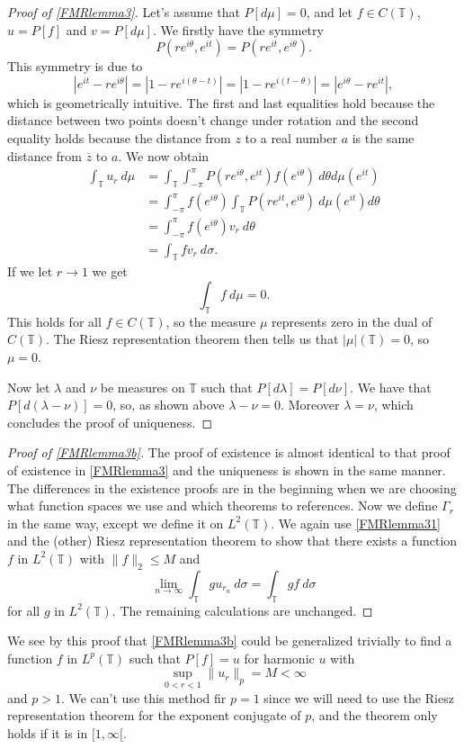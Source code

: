 \documentclass[a4paper,12pt,twoside,BCOR=10mm]{scrbook}
\theoremstyle{definition}
\theoremstyle{definition}
\theoremstyle{definition}
\begin{document}
\begin{proof}[Proof of \ref{FMRlemma3}]
Let's assume that $P[d\mu] = 0$, and let $f \in C(\mathbb{T})$, $u = P[f]$ and $v = P[d\mu]$.
We firstly have the symmetry
\[
	P(re^{i\theta}, e^{it})
	=
	P(re^{it}, e^{i\theta}).
\]
This symmetry is due to
\[
	|e^{it} - re^{i\theta}|
	=
	|1 - re^{i(\theta - t)}|
	=
	|1 - re^{i(t - \theta)}|
	=
	|e^{i\theta} - re^{it}|,
\]
which is geometrically intuitive.
The first and last equalities hold because the distance between two points doesn't change under rotation and the second equality holds because the distance from $z$ to a real number $a$ is the same distance from $\overline{z}$ to $a$.
We now obtain
\begin{align*}
\int_{\mathbb{T}} u_r\ d\mu
&= \int_{\mathbb{T}} \int_{-\pi}^{\pi} P(re^{i\theta}, e^{it}) f(e^{i\theta})\ d\theta d\mu(e^{it})\\
&= \int_{-\pi}^{\pi} f(e^{i\theta}) \int_{\mathbb{T}} P(re^{it}, e^{i\theta})\ d\mu(e^{it}) d\theta\\
&= \int_{-\pi}^{\pi} f(e^{i\theta}) v_r\ d\theta\\
&= \int_{\mathbb{T}} fv_r\ d\sigma.
\end{align*}
If we let $r \rightarrow 1$ we get
\[
	\int_{\mathbb{T}}f\ d\mu = 0.
\]
This holds for all $f \in C(\mathbb{T})$, so the measure $\mu$ represents zero in the dual of $C(\mathbb{T})$.
The Riesz representation theorem then tells us that $|\mu|(\mathbb{T}) = 0$, so $\mu = 0$.

Now let $\lambda$ and $\nu$ be measures on $\mathbb{T}$ such that $P[d\lambda] = P[d\nu]$.
We have that $P[d(\lambda - \nu)] = 0$, so, as shown above $\lambda - \nu = 0$.
Moreover $\lambda = \nu$, which concludes the proof of uniqueness.
\end{proof}
\begin{proof}[Proof of \ref{FMRlemma3b}]
The proof of existence is almost identical to that proof of existence in \ref{FMRlemma3} and the uniqueness is shown in the same manner.
The differences in the existence proofs are in the beginning when we are choosing what function spaces we use and which theorems to references.
Now we define $\Gamma_r$ in the same way, except we define it on $L^2(\mathbb{T})$.
We again use \ref{FMRlemma31} and the (other) Riesz representation theorem to show that there exists a function $f$ in $L^2(\mathbb{T})$ with $\|f\|_2 \leq M$ and
\[
	\lim_{n \rightarrow \infty} \int_{\mathbb{T}} gu_{r_n}\ d\sigma = \int_{\mathbb{T}}gf\ d\sigma
\]
for all $g$ in $L^2(\mathbb{T})$.
The remaining calculations are unchanged.
\end{proof}
We see by this proof that \ref{FMRlemma3b} could be generalized trivially to find a function $f$ in $L^p(\mathbb{T})$ such that $P[f] = u$ for harmonic $u$ with
\[
	\sup_{0 < r < 1} \|u_r\|_p = M < \infty
\]
and $p > 1$.
We can't use this method fir $p = 1$ since we will need to use the Riesz representation theorem for the exponent conjugate of $p$, and the theorem only holds if it is in $[1, \infty[$.
\end{document}
